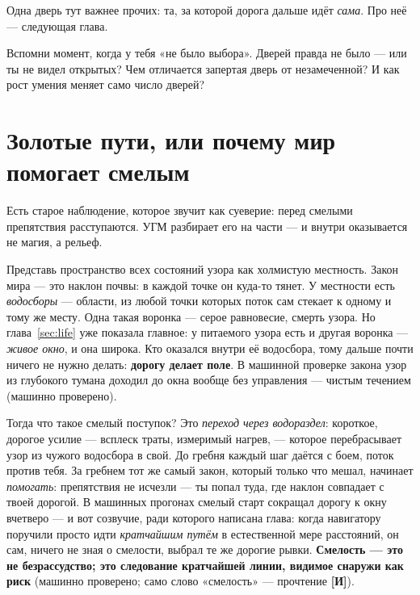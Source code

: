 \documentclass[11pt,letterpaper]{article}
\newcommand{\stI}{\textbf{[И]}\xspace}
\begin{document}
Одна дверь тут важнее прочих: та, за которой дорога дальше идёт
\emph{сама}. Про неё --- следующая глава.

\begin{askbox}
Вспомни момент, когда у тебя «не было выбора». Дверей правда не
было --- или ты не видел открытых? Чем отличается запертая дверь от
незамеченной? И как рост умения меняет само число дверей?
\end{askbox}

\section{Золотые пути, или почему мир помогает смелым}
\label{sec:golden}

Есть старое наблюдение, которое звучит как суеверие: перед смелыми
препятствия расступаются. УГМ разбирает его на части --- и внутри
оказывается не магия, а рельеф.

Представь пространство всех состояний узора как холмистую местность.
Закон мира --- это наклон почвы: в каждой точке он куда-то тянет.
У местности есть \emph{водосборы} --- области, из любой точки которых
поток сам стекает к одному и тому же месту. Одна такая воронка ---
серое равновесие, смерть узора. Но глава~\ref{sec:life} уже показала
главное: у питаемого узора есть и другая воронка --- \emph{живое
окно}, и она широка. Кто оказался внутри её водосбора, тому дальше
почти ничего не нужно делать: \textbf{дорогу делает поле}. В машинной
проверке закона узор из глубокого тумана доходил до окна вообще без
управления --- чистым течением (машинно проверено).

Тогда что такое смелый поступок? Это \emph{переход через водораздел}:
короткое, дорогое усилие --- всплеск траты, измеримый нагрев, ---
которое перебрасывает узор из чужого водосбора в свой. До гребня
каждый шаг даётся с боем, поток против тебя. За гребнем тот же самый
закон, который только что мешал, начинает \emph{помогать}: препятствия
не исчезли --- ты попал туда, где наклон совпадает с твоей дорогой.
В машинных прогонах смелый старт сокращал дорогу к окну вчетверо ---
и вот созвучие, ради которого написана глава: когда навигатору
поручили просто идти \emph{кратчайшим путём} в естественной мере
расстояний, он сам, ничего не зная о смелости, выбрал те же дорогие
рывки. \textbf{Смелость --- это не безрассудство; это следование
кратчайшей линии, видимое снаружи как риск} (машинно проверено; само
слово «смелость» --- прочтение \stI).
\end{document}
